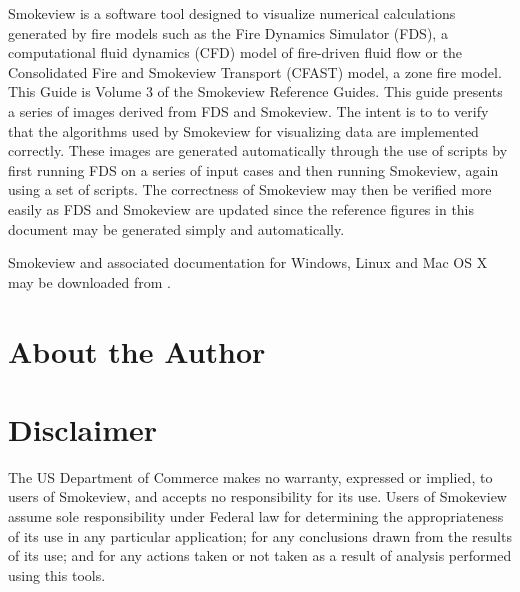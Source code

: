 \documentclass[11pt,twoside]{book}
\begin{document}
Smokeview is a software tool designed to visualize numerical calculations generated by fire models such as the Fire Dynamics Simulator (FDS), a computational fluid dynamics (CFD) model of fire-driven fluid flow or the Consolidated Fire and Smokeview Transport (CFAST) model, a zone fire model. This Guide is Volume 3 of the Smokeview Reference Guides. This guide presents a series of images derived from FDS and Smokeview.  The intent is to to verify that the algorithms used by Smokeview for visualizing data are implemented correctly.  These images are generated automatically through the use of scripts by first running FDS on a series of input cases and then running Smokeview, again using a set of scripts.  The correctness of Smokeview may then be verified more easily as FDS and Smokeview are updated since the reference figures in this document may be generated simply and automatically.

Smokeview and associated documentation for Windows, Linux and Mac OS X may be downloaded from  {\bf {}} .


\chapter{About the Author}
\begin{description}
\gforneybio
\end{description}


\chapter{Disclaimer}

The US Department of Commerce makes no warranty, expressed or implied, to users of Smokeview, and accepts no responsibility for its use. Users of Smokeview assume sole responsibility under Federal law for determining the appropriateness of its use in any particular application; for any conclusions drawn from the results of its use; and for any actions taken or not taken as a result of analysis performed using this tools.
\end{document}
